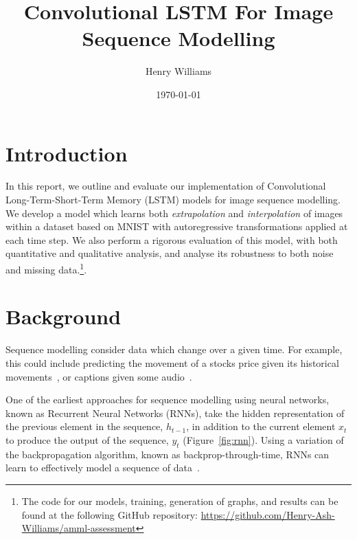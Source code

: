 \documentclass[twocolumn]{article}
\title{Convolutional LSTM For Image Sequence Modelling}
\author{Henry Williams}
\date{\today}
\begin{document}
\maketitle

\section{Introduction}

In this report, we outline and evaluate our implementation of Convolutional Long-Term-Short-Term Memory (LSTM) models for image sequence modelling. We develop a model which learns both \emph{extrapolation} and \emph{interpolation} of images within a dataset based on MNIST with autoregressive transformations applied at each time step. We also perform a rigorous evaluation of this model, with both quantitative and qualitative analysis, and analyse its robustness to both noise and missing data.\footnote{The code for our models, training, generation of graphs, and results can be found at the following GitHub repository: \url{https://github.com/Henry-Ash-Williams/amml-assessment}}. 

\section{Background}

Sequence modelling consider data which change over a given time. For example, this could include predicting the movement of a stocks price given its historical movements~\cite{nelson2017stock}, or captions given some audio~\cite{drossos2017automated}. 

One of the earliest approaches for sequence modelling using neural networks, known as Recurrent Neural Networks (RNNs), take the hidden representation of the previous element in the sequence, $h_{t-1}$, in addition to the current element $x_t$ to produce the output of the sequence, $y_t$ (Figure~\ref{fig:rnn}). Using a variation of the backpropagation algorithm, known as backprop-through-time, RNNs can learn to effectively model a sequence of data~\cite{mozer1995bptt}.
\end{document}
